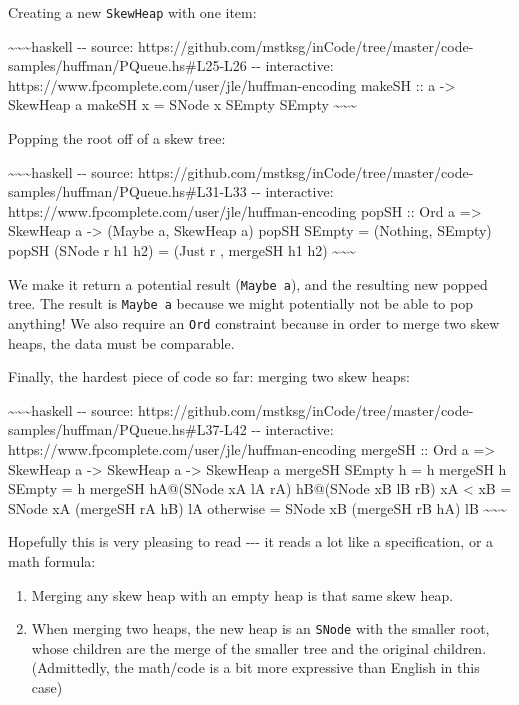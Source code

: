 \documentclass[]{article}
\begin{document}
Creating a new \texttt{SkewHeap} with one item:

\textasciitilde{}\textasciitilde{}\textasciitilde{}haskell -\/- source:
https://github.com/mstksg/inCode/tree/master/code-samples/huffman/PQueue.hs\#L25-L26
-\/- interactive: https://www.fpcomplete.com/user/jle/huffman-encoding makeSH ::
a -\textgreater{} SkewHeap a makeSH x = SNode x SEmpty SEmpty
\textasciitilde{}\textasciitilde{}\textasciitilde{}

Popping the root off of a skew tree:

\textasciitilde{}\textasciitilde{}\textasciitilde{}haskell -\/- source:
https://github.com/mstksg/inCode/tree/master/code-samples/huffman/PQueue.hs\#L31-L33
-\/- interactive: https://www.fpcomplete.com/user/jle/huffman-encoding popSH ::
Ord a =\textgreater{} SkewHeap a -\textgreater{} (Maybe a, SkewHeap a) popSH
SEmpty = (Nothing, SEmpty) popSH (SNode r h1 h2) = (Just r , mergeSH h1 h2)
\textasciitilde{}\textasciitilde{}\textasciitilde{}

We make it return a potential result (\texttt{Maybe\ a}), and the resulting new
popped tree. The result is \texttt{Maybe\ a} because we might potentially not be
able to pop anything! We also require an \texttt{Ord} constraint because in
order to merge two skew heaps, the data must be comparable.

Finally, the hardest piece of code so far: merging two skew heaps:

\textasciitilde{}\textasciitilde{}\textasciitilde{}haskell -\/- source:
https://github.com/mstksg/inCode/tree/master/code-samples/huffman/PQueue.hs\#L37-L42
-\/- interactive: https://www.fpcomplete.com/user/jle/huffman-encoding mergeSH
:: Ord a =\textgreater{} SkewHeap a -\textgreater{} SkewHeap a -\textgreater{}
SkewHeap a mergeSH SEmpty h = h mergeSH h SEmpty = h mergeSH hA@(SNode xA lA rA)
hB@(SNode xB lB rB) \textbar{} xA \textless{} xB = SNode xA (mergeSH rA hB) lA
\textbar{} otherwise = SNode xB (mergeSH rB hA) lB
\textasciitilde{}\textasciitilde{}\textasciitilde{}

Hopefully this is very pleasing to read -\/-\/- it reads a lot like a
specification, or a math formula:

\begin{enumerate}
\tightlist
\item
  Merging any skew heap with an empty heap is that same skew heap.
\item
  When merging two heaps, the new heap is an \texttt{SNode} with the smaller
  root, whose children are the merge of the smaller tree and the original
  children. (Admittedly, the math/code is a bit more expressive than English in
  this case)
\end{enumerate}
\end{document}
